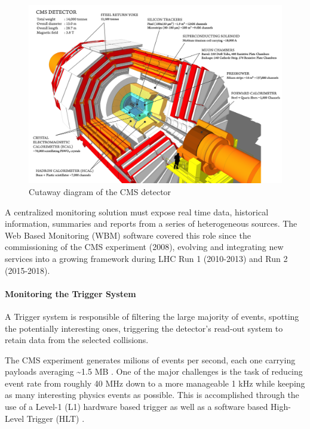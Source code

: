 \documentclass[a4, oneside, 10pt, nobib]{memoir}
\begin{document}
\begin{figure}[H]
    \centerline{
        \includegraphics[width=0.8\paperwidth]{figures/cms}}
    \caption{Cutaway diagram of the CMS detector \cite{Sakuma_2014}}
    \label{fig:cms}
\end{figure}

		A centralized monitoring solution must expose real time data, historical information, summaries and reports from a series of heterogeneous sources. The Web Based Monitoring (WBM) software covered this role since the commissioning of the CMS experiment (2008), evolving and integrating new services into a growing framework during LHC Run 1 (2010-2013) and Run 2 (2015-2018).
\pagebreak
		\paragraph{Monitoring the Trigger System}

		A Trigger system is responsible of filtering the large majority of events, spotting the potentially interesting ones, triggering the detector's read-out system to retain data from the selected collisions.

		The CMS experiment generates milions of events per second, each one carrying payloads averaging \~{}1.5 MB \cite{smdaqatlhc2016v3pdf-2020-10-12}. One of the major challenges is the task of reducing event rate from roughly 40 MHz down to a more manageable 1 kHz while keeping as many interesting physics events as possible. This is accomplished through the use of a Level-1 (L1) \cite{Bayatyan:706847} hardware based trigger as well as a software based High-Level Trigger (HLT) \cite{Khachatryan_2017}. 
\end{document}
